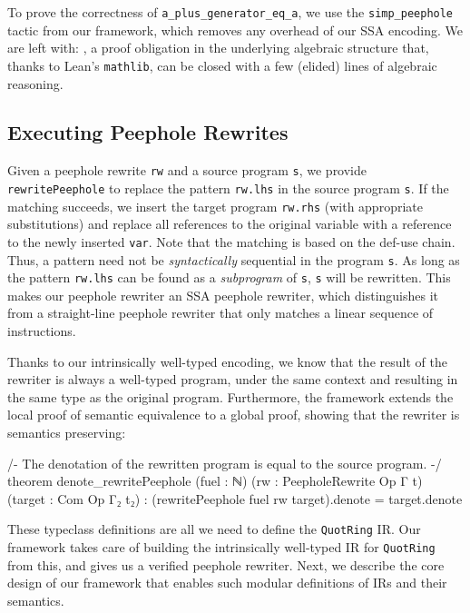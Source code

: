 To prove the correctness of \texttt{a\_plus\_generator\_eq\_a}, we use the \texttt{simp\_peephole}  tactic from our framework, which removes any overhead of our SSA encoding. We are left with:
\newline
{},
a proof obligation in the underlying algebraic structure that, thanks to Lean's \texttt{mathlib}, can be closed with a few (elided) lines of algebraic reasoning.

\subsection{Executing Peephole Rewrites}

Given a peephole rewrite \texttt{rw} and a source program \texttt{s}, we provide \texttt{rewritePeephole} to replace the pattern \texttt{rw.lhs} in the source program \texttt{s}.
If the matching succeeds, we insert the target program \texttt{rw.rhs} (with appropriate substitutions) and replace all references to the original variable with a reference to the newly inserted \texttt{var}.
Note that the matching is based on the def-use chain.
Thus, a pattern need not be \emph{syntactically} sequential in the program \texttt{s}.
As long as the pattern \texttt{rw.lhs} can be found as a \emph{subprogram} of \texttt{s}, \texttt{s} will be rewritten.
This makes our peephole rewriter an SSA peephole rewriter, which distinguishes it from a straight-line peephole rewriter that only matches a linear sequence of instructions.

Thanks to our intrinsically well-typed encoding, we know that the result of the rewriter is always a well-typed program, under the same context and resulting in the same type as the original program.
Furthermore, the framework extends the local proof of semantic equivalence to a global proof, showing that the rewriter is semantics preserving:

\begin{lean}
/- The denotation of the rewritten program is equal to the source program. -/
theorem denote_rewritePeephole (fuel : ℕ) (rw : PeepholeRewrite Op Γ t)
  (target : Com Op Γ₂ t₂) : (rewritePeephole fuel rw target).denote = target.denote
\end{lean}

These typeclass definitions are all we need to define the \texttt{QuotRing} IR.
Our framework takes care of building the intrinsically well-typed IR for \texttt{QuotRing} from this, and gives us a verified peephole rewriter.
Next, we describe the core design of our framework that enables such modular definitions of IRs and their semantics.


